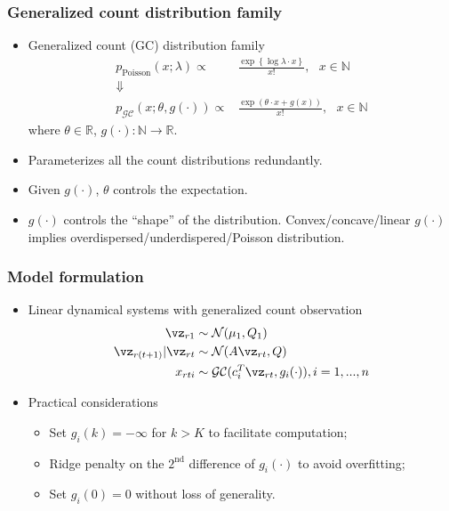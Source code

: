 \documentclass[16pt,presentation]{beamer}
\begin{document}
\begin{frame}
\frametitle{Generalized count distribution family}
\begin{itemize}
\item Generalized count (GC) distribution family
\[\begin{split}
p_{\text{Poisson}}(x; \lambda) \propto& \frac{\exp\left\{\log{\lambda} \cdot x\right\}}{x!},~~~x \in \mathbb{N}\\
\Downarrow&\\
p_{\mathcal{GC}}(x; \theta, g(\cdot)) \propto& \frac{\exp(\theta \cdot x + g(x) )}{x!}, ~~~x \in \mathbb{N}
\end{split}\]
where $\theta \in \mathbb{R}$, $g(\cdot): \mathbb{N} \rightarrow \mathbb{R}$.
\item Parameterizes \alert{all} the count distributions \alert{redundantly}.
\item Given $g(\cdot)$, $\theta$ controls the expectation.
\item $g(\cdot)$ controls the ``shape'' of the distribution. Convex/concave/linear $g(\cdot)$ implies overdispersed/underdispered/Poisson distribution.
\end{itemize}
\end{frame}


\begin{frame}
\frametitle{Model formulation}
 \begin{itemize}
 \item Linear dynamical systems with generalized count observation 
 \[\begin{split}
 \vz_{r1} &\sim \N(\mu_1, Q_1)\\
 \vz_{r(t+1)} | \vz_{rt} &\sim \N(A \vz_{rt}, Q)\\
 x_{rti} & \sim \mathcal{GC}(c_i^T \vz_{rt}, g_i(\cdot)), i = 1,...,n
 \end{split}\]
 \item Practical considerations
 \begin{itemize}
 \item Set $g_i(k) = -\infty$ for $k > K$ to facilitate computation;
 \item Ridge penalty on the $2^{\text{nd}}$ difference of $g_i(\cdot)$ to avoid overfitting;
 \item Set $g_i(0) = 0$ without loss of generality.
 \end{itemize}
 \end{itemize}
\end{frame}
\end{document}

